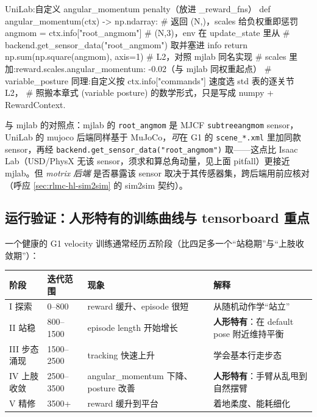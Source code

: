 \begin{codebox}[Python]{UniLab:自定义 angular\_momentum penalty（放进 \_reward\_fns）}
def angular_momentum(ctx) -> np.ndarray:        # 返回 (N,)，scales 给负权重即惩罚
    angmom = ctx.info["root_angmom"]            # (N,3)，env 在 update_state 里从
                                                # backend.get_sensor_data("root_angmom") 取并塞进 info
    return np.sum(np.square(angmom), axis=1)    # L2，对照 mjlab 同名实现
# scales 里加:reward.scales.angular_momentum: -0.02（与 mjlab 同权重起点）
# variable_posture 同理:自定义按 ctx.info["commands"] 速度选 std 表的逐关节 L2，
#   照搬本章式 (variable posture) 的数学形式，只是写成 numpy + RewardContext.
\end{codebox}

与 mjlab 的对照点：mjlab 的 \texttt{root\_angmom} 是 MJCF \texttt{subtreeangmom} sensor，UniLab 的 mujoco 后端同样基于 MuJoCo，\emph{可}在 G1 的 \texttt{scene\_*.\allowbreak xml} 里加同款 sensor，再经 \texttt{backend.\allowbreak get\_sensor\_data("root\_angmom")} 取——这点比 Isaac Lab（USD/PhysX 无该 sensor，须求和算总角动量，见上面 pitfall）更接近 mjlab。但 \emph{motrix 后端} 是否暴露该 sensor 取决于其传感器集，跨后端用前应核对（呼应 \cref{sec:rlmc-hl-sim2sim} 的 sim2sim 契约）。

\subsection{运行验证：人形特有的训练曲线与 tensorboard 重点}
一个健康的 G1 velocity 训练通常经历\emph{五}阶段（比四足多一个“站稳期”与“上肢收敛期”）：

\begin{center}
\small
\begin{tabular}{p{2.4cm}p{1.8cm}p{3.6cm}p{3.6cm}}
\hline
阶段 & 迭代范围 & 现象 & 解释 \\
\hline
I 探索 & 0--800 & reward 缓升、episode 很短 & 从随机动作学“站立” \\
II 站稳 & 800--1500 & episode length 开始增长 & \textbf{人形特有}：在 default pose 附近维持平衡 \\
III 步态涌现 & 1500--2500 & tracking 快速上升 & 学会基本行走步态 \\
IV 上肢收敛 & 2500--3500 & angular\_momentum 下降、posture 改善 & \textbf{人形特有}：手臂从乱甩到自然摆臂 \\
V 精修 & 3500+ & reward 缓升到平台 & 着地柔度、能耗细化 \\
\hline
\end{tabular}
\end{center}


